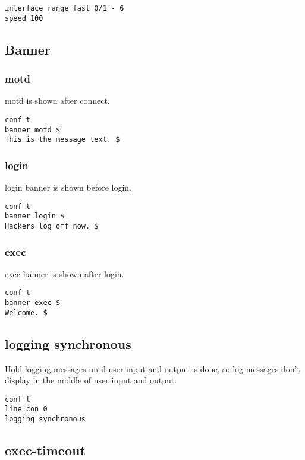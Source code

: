 \begin{verbatim}
interface range fast 0/1 - 6
speed 100
\end{verbatim}

\subsection{Banner}

\subsubsection{motd}

motd is shown after connect.

\begin{verbatim}
conf t
banner motd $
This is the message text. $
\end{verbatim}

\subsubsection{login}

login banner is shown before login.

\begin{verbatim}
conf t
banner login $
Hackers log off now. $
\end{verbatim}

\subsubsection{exec}

exec banner is shown after login.

\begin{verbatim}
conf t
banner exec $
Welcome. $
\end{verbatim}

\subsection{logging synchronous}

Hold logging messages until user input and output is done, so log messages
don't display in the middle of user input and output.

\begin{verbatim}
conf t
line con 0
logging synchronous
\end{verbatim}

\subsection{exec-timeout}

